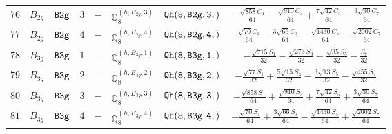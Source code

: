 \documentclass[fleqn,8pt]{jsarticle}
\begin{document}
\begin{table}[ht!]
\begin{center}
\begin{tabular}{cccccccc}
$ 76 $ & $ B_{2g} $ & $ {\tt B2g} $ & $ 3 $ & $ - $ & $ \mathbb{Q}_{8}^{(h,B_{2g},3)} $ & $ {\tt Qh(8,B2g,3,)} $ & $ - \frac{\sqrt{858} C_{1}}{64} - \frac{\sqrt{910} C_{3}}{64} + \frac{7 \sqrt{42} C_{5}}{64} - \frac{3 \sqrt{30} C_{7}}{64} $ \\
$ 77 $ & $ B_{2g} $ & $ {\tt B2g} $ & $ 4 $ & $ - $ & $ \mathbb{Q}_{8}^{(h,B_{2g},4)} $ & $ {\tt Qh(8,B2g,4,)} $ & $ - \frac{\sqrt{70} C_{1}}{64} - \frac{3 \sqrt{66} C_{3}}{64} - \frac{\sqrt{1430} C_{5}}{64} - \frac{\sqrt{2002} C_{7}}{64} $ \\
$ 78 $ & $ B_{3g} $ & $ {\tt B3g} $ & $ 1 $ & $ - $ & $ \mathbb{Q}_{8}^{(h,B_{3g},1)} $ & $ {\tt Qh(8,B3g,1,)} $ & $ - \frac{\sqrt{715} S_{1}}{32} - \frac{\sqrt{273} S_{3}}{32} - \frac{\sqrt{35} S_{5}}{32} - \frac{S_{7}}{32} $ \\
$ 79 $ & $ B_{3g} $ & $ {\tt B3g} $ & $ 2 $ & $ - $ & $ \mathbb{Q}_{8}^{(h,B_{3g},2)} $ & $ {\tt Qh(8,B3g,2,)} $ & $ - \frac{\sqrt{77} S_{1}}{32} + \frac{5 \sqrt{15} S_{3}}{32} - \frac{3 \sqrt{13} S_{5}}{32} - \frac{\sqrt{455} S_{7}}{32} $ \\
$ 80 $ & $ B_{3g} $ & $ {\tt B3g} $ & $ 3 $ & $ - $ & $ \mathbb{Q}_{8}^{(h,B_{3g},3)} $ & $ {\tt Qh(8,B3g,3,)} $ & $ - \frac{\sqrt{858} S_{1}}{64} + \frac{\sqrt{910} S_{3}}{64} + \frac{7 \sqrt{42} S_{5}}{64} + \frac{3 \sqrt{30} S_{7}}{64} $ \\
$ 81 $ & $ B_{3g} $ & $ {\tt B3g} $ & $ 4 $ & $ - $ & $ \mathbb{Q}_{8}^{(h,B_{3g},4)} $ & $ {\tt Qh(8,B3g,4,)} $ & $ - \frac{\sqrt{70} S_{1}}{64} + \frac{3 \sqrt{66} S_{3}}{64} - \frac{\sqrt{1430} S_{5}}{64} + \frac{\sqrt{2002} S_{7}}{64} $ \\
 \hline \hline
\end{tabular}
\end{center}
\end{table}
\end{document}
